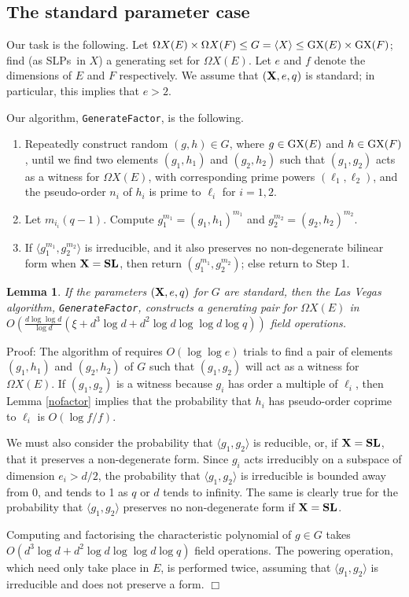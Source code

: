 \documentclass[12pt]{article}
\newtheorem{lemma}[definition]{Lemma}
\newenvironment{proof}{\normalsize {\sc Proof}:}{{\hfill $\Box$ \\}}
\def\Oh{O}  %
\def\GX{{\rm GX}}
\def\X{{\rm X}}
\def\X{{\bf X}}
\def\SLPs{{\rm SLPs}}
\begin{document}
\subsection{The standard parameter case}
Our task is the following.  Let 
$\Omega X(E)\times\Omega X(F) \leq G = \langle X \rangle \leq
\GX(E)\times\GX(F)$;
find (as \SLPs\ in $X$) a generating set for $\Omega X(E)$. 
Let $e$ and $f$ denote the dimensions of $E$ and $F$ respectively.
We assume that $(\X, e, q)$ is standard; in
particular, this implies that $e > 2$.

Our algorithm, {\tt GenerateFactor}, is the following.
\begin{enumerate}
\item 
Repeatedly construct random 
$(g, h) \in G$, where $g\in\GX(E)$ and $h\in\GX(F)$, until 
we find two elements
$(g_1, h_1)$ and $(g_2, h_2)$ such that $(g_1, g_2)$ acts as a witness 
for $\Omega X(E)$, with corresponding prime powers
$(\ell_1,\ell_2)$, and the pseudo-order $n_i$ of $h_i$ 
is prime to $\ell_i$ for $i=1,2$.  
\item Let $m_i_i(q-1)$.
Compute $g_1^{m_1}=(g_1,h_1)^{m_1}$
and $g_2^{m_2}=(g_2,h_2)^{m_2}$.
\item 
If $\langle g_1^{m_1},g_2^{m_2}\rangle$ is irreducible, 
and it also preserves no non-degenerate bilinear form when $\X=\mathbf{SL}$,
then return $(g_1^{m_1},g_2^{m_2})$; else return to Step 1.
\end{enumerate}

\begin{lemma} \label{standard-parameters}
If the parameters $(\X,e,q)$ for $G$ are standard,
then the Las Vegas algorithm, {\tt GenerateFactor},
constructs a generating pair for $\Omega X(E)$ in
$\Oh(\frac{d \log\log d}{\log d}(\xi+d^3 \log d + d^2 \log d \log\log d\log q))$ field operations.
\end{lemma}
\begin{proof}
The algorithm of \cite{NP} requires $\Oh(\log\log e)$ trials to 
find a pair
of elements $(g_1,h_1)$ and $(g_2,h_2)$ of $G$ such that $(g_1,g_2)$ will act
as a witness for $\Omega X(E)$.
If $(g_1,g_2)$ is a witness because $g_i$ has order
a multiple of $\ell_i$, then Lemma \ref{nofactor} implies that 
the probability that $h_i$ has pseudo-order coprime   
to $\ell_i$ is $\Oh(\log f/f)$.  

We must also consider the probability that $\langle g_1,g_2\rangle$
is reducible, or, if $\X=\mathbf{SL}$, that 
it preserves a non-degenerate form.  Since $g_i$ acts
irreducibly on a subspace of dimension $e_i>d/2$, the probability 
that $\langle g_1,g_2\rangle$ is irreducible is bounded away from 0, 
and tends to 1 as $q$ or $d$ tends to infinity.  
The same is clearly true for the probability 
that $\langle g_1,g_2\rangle$
preserves no non-degenerate form if $\X=\mathbf{SL}$.

Computing and factorising 
the characteristic polynomial of $g \in G$ 
takes $\Oh(d^3 \log d + d^2 \log d \log\log d \log q)$
field operations. 
The powering operation, which need only take place in
$E$, is performed twice, assuming that 
$\langle g_1,g_2\rangle$ is irreducible and does not preserve a form.  
\end{proof}
\end{document}
